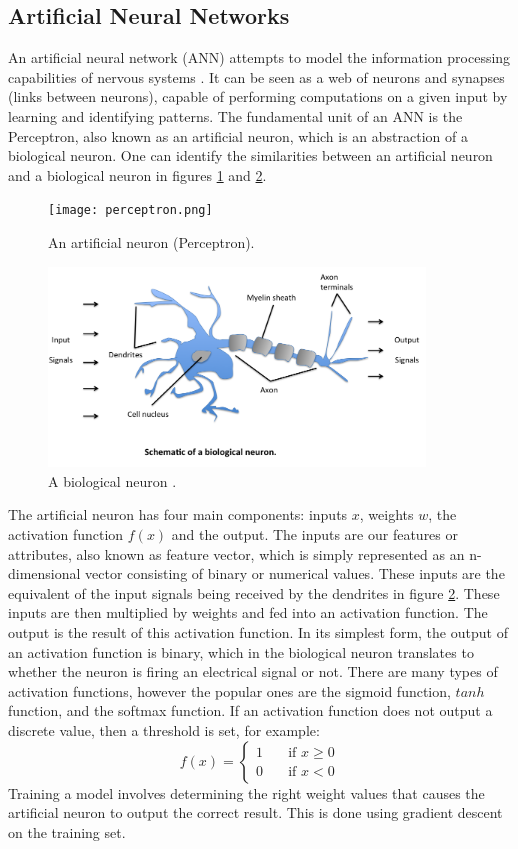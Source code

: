 \documentclass{UoYCSproject}
\begin{document}
\subsection{Artificial Neural Networks}
An artificial neural network (ANN) attempts to model the information processing capabilities of nervous systems \cite{rojas2013neural}. It can be seen as a web of neurons and synapses (links between neurons), capable of performing computations on a given input by learning and identifying patterns. The fundamental unit of an ANN is the Perceptron, also known as an artificial neuron, which is an abstraction of a biological neuron. One can identify the similarities between an artificial neuron and a biological neuron in figures \ref{fig:artificialneuron} and \ref{fig:biologicalneuron}.  

\begin{figure}[h]
\texttt{[image: perceptron.png]}
\centering
\caption{An artificial neuron (Perceptron).} 
\label{fig:artificialneuron}
\end{figure}

\begin{figure}[h]
\includegraphics[width=10cm]{perceptron_neuron.png}
\centering
\caption{A biological neuron \cite{neuron}.} 
\label{fig:biologicalneuron}
\end{figure}

The artificial neuron has four main components: inputs $x$, weights $w$, the activation function $f(x)$ and the output. The inputs are our features or attributes, also known as feature vector, which is simply represented as an n-dimensional vector consisting of binary or numerical values. These inputs are the equivalent of the input signals being received by the dendrites in figure \ref{fig:biologicalneuron}. These inputs are then multiplied by weights and fed into an activation function. The output is the result of this activation function. In its simplest form, the output of an activation function is binary, which in the biological neuron translates to whether the neuron is firing an electrical signal or not. There are many types of activation functions, however the popular ones are the sigmoid function, $tanh$ function, and the softmax function. If an activation function does not output a discrete value, then a threshold is set, for example:  \[ f(x) =
  \begin{cases}
    1       & \quad \text{if } x \geq 0\\
    0       & \quad \text{if } x < 0
  \end{cases}
\]
Training a model involves determining the right weight values that causes the artificial neuron to output the correct result. This is done using gradient descent on the training set. 
\end{document}
